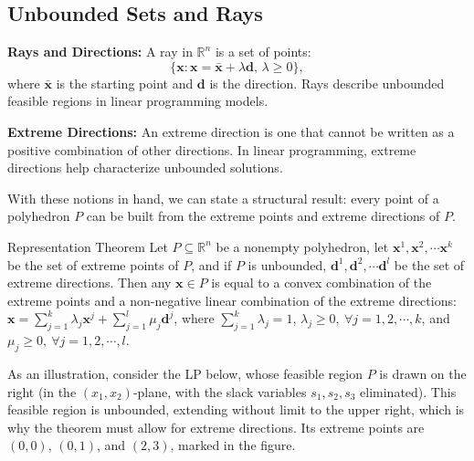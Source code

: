 \subsection{Unbounded Sets and Rays}

\textbf{Rays and Directions:}  
A ray in \(\mathbb{R}^n\) is a set of points:
\[
\{\mathbf{x} : \mathbf{x} = \mathbf{\bar x} + \lambda \mathbf{d}, \, \lambda \geq 0\},
\]
where \(\mathbf{\bar x}\) is the starting point and \(\mathbf{d}\) is the direction. Rays describe unbounded feasible regions in linear programming models.

\textbf{Extreme Directions:}  
An extreme direction is one that cannot be written as a positive combination of other directions. In linear programming, extreme directions help characterize unbounded solutions.

\medskip
With these notions in hand, we can state a structural result: every point of a polyhedron \( P \) can be built from the extreme points and extreme directions of \( P \).

\begin{theorem}{Representation Theorem}
\label{thm:representation}
 Let \( P \subseteq \mathbb{R}^n \) be a nonempty polyhedron, let $\mathbf{x}^1, \mathbf{x}^2,\cdots \mathbf{x}^k$ be the set of extreme points of $P$, and if $P$ is unbounded, $\mathbf{d}^1, \mathbf{d}^2,\cdots \mathbf{d}^l$ be the set of extreme directions. Then any $\mathbf{x} \in P$ is equal to a convex combination of the extreme points and a non-negative linear combination of the extreme directions: $\mathbf{x} = \sum_{j=1}^k \lambda_j \mathbf{x}^j + \sum_{j=1}^l \mu_j \mathbf{d}^j$, where $\sum_{j=1}^k \lambda_j = 1$, $\lambda_j \ge 0,~\forall  j=1,2,\cdots,k$, and $\mu_j \ge 0,~\forall j=1,2,\cdots,l$.
 \end{theorem}

As an illustration, consider the LP below, whose feasible region \( P \) is drawn on the right (in the \((x_1,x_2)\)-plane, with the slack variables \(s_1, s_2, s_3\) eliminated). This feasible region is unbounded, extending without limit to the upper right, which is why the theorem must allow for extreme directions. Its extreme points are \((0,0)\), \((0,1)\), and \((2,3)\), marked in the figure.

